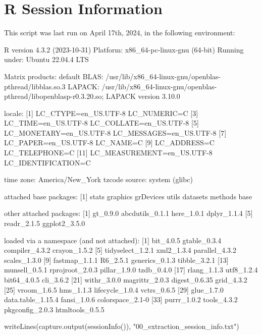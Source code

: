 \documentclass[
  letterpaper,
  DIV=11,
  numbers=noendperiod]{scrreprt}
\newenvironment{Shaded}{\begin{snugshade}}{\end{snugshade}}
\newcommand{\FunctionTok}[1]{\textcolor[rgb]{0.28,0.35,0.67}{#1}}
\newcommand{\NormalTok}[1]{\textcolor[rgb]{0.00,0.23,0.31}{#1}}
\newcommand{\StringTok}[1]{\textcolor[rgb]{0.13,0.47,0.30}{#1}}
\begin{document}
\chapter{R Session Information}\label{r-session-information}

This script was last run on April 17th, 2024, in the following
environment:

R version 4.3.2 (2023-10-31) Platform: x86\_64-pc-linux-gnu (64-bit)
Running under: Ubuntu 22.04.4 LTS

Matrix products: default BLAS:
/usr/lib/x86\_64-linux-gnu/openblas-pthread/libblas.so.3 LAPACK:
/usr/lib/x86\_64-linux-gnu/openblas-pthread/libopenblasp-r0.3.20.so;
LAPACK version 3.10.0

locale: {[}1{]} LC\_CTYPE=en\_US.UTF-8 LC\_NUMERIC=C {[}3{]}
LC\_TIME=en\_US.UTF-8 LC\_COLLATE=en\_US.UTF-8 {[}5{]}
LC\_MONETARY=en\_US.UTF-8 LC\_MESSAGES=en\_US.UTF-8 {[}7{]}
LC\_PAPER=en\_US.UTF-8 LC\_NAME=C {[}9{]} LC\_ADDRESS=C LC\_TELEPHONE=C
{[}11{]} LC\_MEASUREMENT=en\_US.UTF-8 LC\_IDENTIFICATION=C

time zone: America/New\_York tzcode source: system (glibc)

attached base packages: {[}1{]} stats graphics grDevices utils datasets
methods base

other attached packages: {[}1{]} gt\_0.9.0 abcdutils\_0.1.1 here\_1.0.1
dplyr\_1.1.4 {[}5{]} readr\_2.1.5 ggplot2\_3.5.0

loaded via a namespace (and not attached): {[}1{]} bit\_4.0.5
gtable\_0.3.4 compiler\_4.3.2 crayon\_1.5.2 {[}5{]} tidyselect\_1.2.1
xml2\_1.3.4 parallel\_4.3.2 scales\_1.3.0 {[}9{]} fastmap\_1.1.1
R6\_2.5.1 generics\_0.1.3 tibble\_3.2.1 {[}13{]} munsell\_0.5.1
rprojroot\_2.0.3 pillar\_1.9.0 tzdb\_0.4.0 {[}17{]} rlang\_1.1.3
utf8\_1.2.4 bit64\_4.0.5 cli\_3.6.2 {[}21{]} withr\_3.0.0
magrittr\_2.0.3 digest\_0.6.35 grid\_4.3.2 {[}25{]} vroom\_1.6.5
hms\_1.1.3 lifecycle\_1.0.4 vctrs\_0.6.5 {[}29{]} glue\_1.7.0
data.table\_1.15.4 fansi\_1.0.6 colorspace\_2.1-0 {[}33{]} purrr\_1.0.2
tools\_4.3.2 pkgconfig\_2.0.3 htmltools\_0.5.5

\begin{Shaded}
\begin{Highlighting}[]
\FunctionTok{writeLines}\NormalTok{(}\FunctionTok{capture.output}\NormalTok{(}\FunctionTok{sessionInfo}\NormalTok{()), }\StringTok{"00\_extraction\_session\_info.txt"}\NormalTok{)}
\end{Highlighting}
\end{Shaded}
\end{document}
